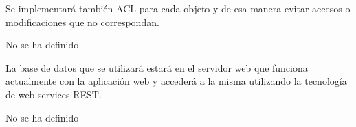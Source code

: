 Se implementará también ACL para cada objeto y de esa manera evitar accesos o modificaciones que no correspondan.

        
        No se ha definido 
        
        
        La base de datos que se utilizará estará en el servidor web que funciona actualmente con la aplicación web y accederá a la misma utilizando la tecnología de web services REST.
        
        
        No se ha definido
        

\setcounter{secnumdepth}{-1}



